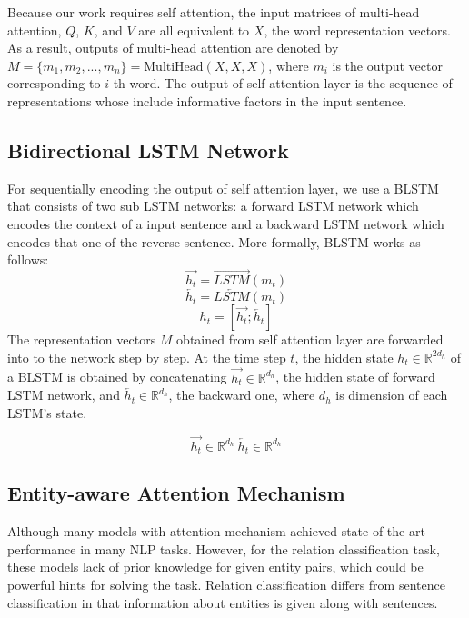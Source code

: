 \documentclass[twoside,leqno,twocolumn]{article}
\begin{document}
Because our work requires self attention, the input matrices of multi-head attention, $Q$, $K$, and $V$ are all equivalent to $X$, the word representation vectors. As a result, outputs of multi-head attention are denoted by $M=\{m_1, m_2, ..., m_n\}=\text{MultiHead}(X, X, X)$, where $m_i$ is the output vector corresponding to $i$-th word.
The output of self attention layer is the sequence of representations whose include informative factors in the input sentence.



\subsection{Bidirectional LSTM Network}
For sequentially encoding the output of self attention layer, we use a BLSTM \cite{graves2005framewise, graves2013speech} that consists of two sub LSTM networks: a forward LSTM network which encodes the context of a input sentence and a backward LSTM network which encodes that one of the reverse sentence.
More formally, BLSTM works as follows:
\begin{equation}
\overrightarrow{h_t}=\overrightarrow{LSTM}(m_{t})
\label{e3.4}
\end{equation}
\begin{equation}
\overleftarrow{h_t}=\overleftarrow{LSTM}(m_{t})
\label{e3.5}
\end{equation}
\begin{equation} 
h_t=[\overrightarrow{h_t}; \overleftarrow{h_t}]
\label{e3.6}
\end{equation}
The representation vectors $M$ obtained from self attention layer are forwarded into to the network step by step. At the time step $t$, the hidden state $h_t\in \mathbb{R}^{2d_h}$ of a BLSTM is obtained by concatenating $\overrightarrow{h_t}\in \mathbb{R}^{d_h}$, the hidden state of forward LSTM network, and $\overleftarrow{h_t}\in \mathbb{R}^{d_h}$, the backward one, where $d_h$ is dimension of each LSTM's state.


\begin{equation}
    \overrightarrow{h_t}\in \mathbb{R}^{d_h} \: \overleftarrow{h_t}\in \mathbb{R}^{d_h}
\end{equation}
\subsection{Entity-aware Attention Mechanism}
Although many models with attention mechanism achieved state-of-the-art performance in many NLP tasks.
However, for the relation classification task, these models lack of prior knowledge for given entity pairs, which could be powerful hints for solving the task.
Relation classification differs from sentence classification in that information about entities is given along with sentences.
\end{document}
